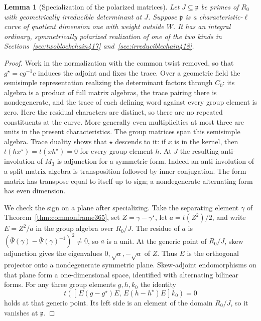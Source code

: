 \documentclass[a4paper,11pt]{article}
\newtheorem{lemma}[proposition]{Lemma}
\theoremstyle{definition}
\theoremstyle{remark}
\numberwithin{equation}{section}
\begin{document}
\begin{lemma}[Specialization of the polarized matrices]\leavevmode
\label{lem:positivefibers419}
Let \(J\subseteq\mathfrak p\) be primes of \(R_0\) with
geometrically irreducible determinant at \(J\). Suppose
\(\mathfrak p\) is a characteristic-\(\ell\) curve of
quotient dimension one with weight outside \(W\). It has
an integral ordinary, symmetrically polarized realization of
one of the two kinds in Sections~\ref{sec:twoblockchain417}
and~\ref{sec:irreduciblechain418}.
\end{lemma}
\begin{proof}
Work in the normalization with the common twist removed,
so that \(g^\star=cg^{-1}c\) induces the adjoint and fixes
the trace. Over a geometric field the semisimple representation
realizing the determinant factors through \(C_0\): its
algebra is a product of full matrix algebras, the trace
pairing there is nondegenerate, and the trace of each defining
word against every group element is zero. Here the residual
characters are distinct, so there are no repeated constituents
at the curve. More generally even multiplicities at most three
are units in the present characteristics. The group matrices
span this semisimple algebra. Trace duality shows that
\(\star\) descends to it: if \(x\) is in the kernel, then
\(t(hx^\star)=t(xh^\star)=0\) for every group element \(h\).
At \(J\) the resulting anti-involution of \(M_3\) is adjunction
for a symmetric form. Indeed an anti-involution of a split
matrix algebra is transposition followed by inner conjugation.
The form matrix has transpose equal to itself up to sign;
a nondegenerate alternating form has even dimension.

We check the sign on a plane after specializing.
Take the separating element \(\gamma\) of
Theorem~\ref{thm:commonframe365}, set
\(Z=\gamma-\gamma^\star\), let \(a=t(Z^2)/2\), and write
\(E=Z^2/a\) in the group algebra over \(R_0/J\).
The residue of \(a\) is
\((\bar\Psi(\gamma)-\bar\Psi(\gamma)^{-1})^2\ne0\), so
\(a\) is a unit. At the generic point of \(R_0/J\), skew
adjunction gives the eigenvalues \(0,\sqrt a,-\sqrt a\)
of \(Z\). Thus \(E\) is the orthogonal projector onto a
nondegenerate symmetric plane. Skew-adjoint endomorphisms
on that plane form a one-dimensional space, identified
with alternating bilinear forms. For any three group
elements \(g,h,k_0\) the identity
\[
 t\!\left([\,E(g-g^\star)E,\,E(h-h^\star)E\,]k_0\right)=0
\]
holds at that generic point. Its left side is an element
of the domain \(R_0/J\), so it vanishes at \(\mathfrak p\).


\end{proof}
\end{document}
